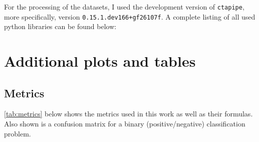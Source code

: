 For the processing of the datasets, I used the development version of \texttt{ctapipe}, more specifically, version
\texttt{0.15.1.dev166+gf26107f}. A complete listing of all used python libraries can be found below:
\begin{spacing}{0.5}
    \begin{mdframed}[backgroundcolor=codebg, hidealllines=true, leftmargin=0cm,rightmargin=0cm, skipabove=0pt, innerleftmargin=0,innerrightmargin=0,]
    
    \end{mdframed}
\end{spacing}


\section{Additional plots and tables}
\label{ap:additional_plots_tables}

\subsection{Metrics}
\label{ap:metrics}
\autoref{tab:metrics} below shows the metrics used in this work as well as their formulas. Also shown is a confusion matrix for
a binary (positive/negative) classification problem.

